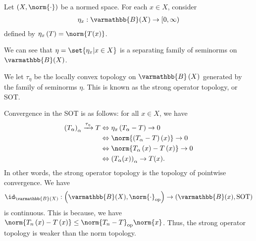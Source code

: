 \documentclass[10pt]{mypackage}
\renewcommand*{\mathbb}[1]{\varmathbb{#1}}
\newcommand{\B}{\mathbb{B}}
\begin{document}
\begin{example}
  Let $\left(X,\norm{\cdot}\right)$ be a normed space. For each $x\in X$, consider
  \begin{align*}
    \eta_{x}: \B(X) \rightarrow [0,\infty)
  \end{align*}
  defined by $\eta_{x}\left(T\right) = \norm{T(x)}$.\newline

  We can see that $\eta = \set{\eta_x | x\in X}$ is a separating family of seminorms on $\B(X)$.\newline

  We let $\tau_{\eta}$ be the locally convex topology on $\B\left(X\right)$ generated by the family of seminorms $\eta$. This is known as the strong operator topology, or SOT.\newline

  Convergence in the SOT is as follows: for all $x\in X$, we have
  \begin{align*}
    \left(T_{\alpha}\right)_{\alpha}\xrightarrow{\tau_{\eta}} T &\Leftrightarrow \eta_{x}\left(T_{\alpha} - T\right)\rightarrow 0\\
                                                                &\Leftrightarrow \norm{\left(T_{\alpha} - T\right)\left(x\right)} \rightarrow 0\\
                                                                &\Leftrightarrow \norm{T_{\alpha}\left(x\right) - T\left(x\right)}\rightarrow 0\\
                                                                &\Leftrightarrow \left(T_{\alpha}(x)\right)_{\alpha}\rightarrow T(x).
  \end{align*}
  In other words, the strong operator topology is the topology of pointwise convergence. We have
  \begin{align*}
    \id_{\B(X)}: \left(\B(X),\norm{\cdot}_{\text{op}}\right) \rightarrow \left(\B(x),\text{SOT}\right)
  \end{align*}
  is continuous. This is because, we have $\norm{T_{n}\left(x\right) - T\left(x\right)}\leq \norm{T_n - T}_{\text{op}} \norm{x}$. Thus, the strong operator topology is weaker than the norm topology.\newline


\end{example}
\end{document}
